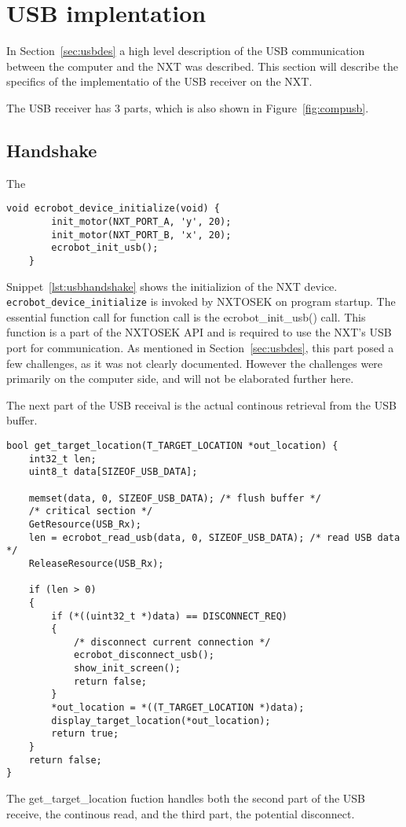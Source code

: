 \section{USB implentation}
\label{sec:usbimp}
In Section~\ref{sec:usbdes} a high level description of the USB communication between the computer and the NXT was described.
This section will describe the specifics of the implementatio of the USB receiver on the NXT.

The USB receiver has 3 parts, which is also shown in Figure~\ref{fig:compusb}.

\subsection{Handshake}
The
\begin{lstlisting}[language=CSharp,label={lst:usbhandshake},caption={ecrobot\_device\_initialize method from nxt.c}]
    void ecrobot_device_initialize(void) {
        init_motor(NXT_PORT_A, 'y', 20);
        init_motor(NXT_PORT_B, 'x', 20);
        ecrobot_init_usb();
    }
\end{lstlisting}
Snippet~\ref{lst:usbhandshake} shows the initializion of the NXT device. 
\texttt{ecrobot\_device\_initialize} is invoked by NXTOSEK on program startup.
The essential function call for function call is the ecrobot\_init\_usb() call.
This function is a part of the NXTOSEK API and is required to use the NXT's USB port for communication.
As mentioned in Section~\ref{sec:usbdes}, this part posed a few challenges, as it was not clearly documented.
However the challenges were primarily on the computer side, and will not be elaborated further here.

The next part of the USB receival is the actual continous retrieval from the USB buffer.
\begin{lstlisting}[language=CSharp,label={lst:usbreceive},caption={get\_target\_location method from data\_receive.c}]
    bool get_target_location(T_TARGET_LOCATION *out_location) {
	int32_t len;
	uint8_t data[SIZEOF_USB_DATA];

    memset(data, 0, SIZEOF_USB_DATA); /* flush buffer */
	/* critical section */
	GetResource(USB_Rx);
	len = ecrobot_read_usb(data, 0, SIZEOF_USB_DATA); /* read USB data */
	ReleaseResource(USB_Rx);

	if (len > 0)
	{
		if (*((uint32_t *)data) == DISCONNECT_REQ)
		{
			/* disconnect current connection */
			ecrobot_disconnect_usb();
			show_init_screen();
			return false;
		}
		*out_location = *((T_TARGET_LOCATION *)data);
		display_target_location(*out_location);
		return true;
	}
	return false;
}
\end{lstlisting}
The get\_target\_location fuction handles both the second part of the USB receive, the continous read, and the third part, the potential disconnect.


